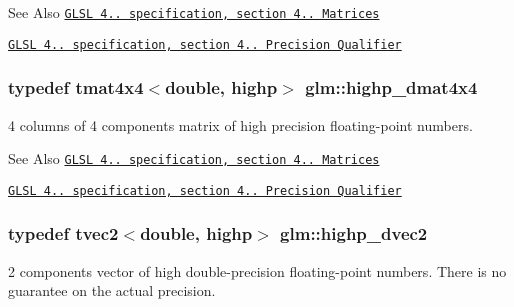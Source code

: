 \begin{DoxySeeAlso}{See Also}
\href{http://www.opengl.org/registry/doc/GLSLangSpec.4.20.8.pdf}{\tt G\-L\-S\-L 4.. specification, section 4.. Matrices} 

\href{http://www.opengl.org/registry/doc/GLSLangSpec.4.20.8.pdf}{\tt G\-L\-S\-L 4.. specification, section 4.. Precision Qualifier} 
\end{DoxySeeAlso}
\hypertarget{group__core__precision_ga46855bd8fdcb8dbc7db5d2aaeb91be69}{
\subsubsection[{highp\-\_\-dmat4x4}]{\setlength{\rightskip}{0pt plus 5cm}typedef tmat4x4$<$double, highp$>$ {\bf glm\-::highp\-\_\-dmat4x4}}}\label{group__core__precision_ga46855bd8fdcb8dbc7db5d2aaeb91be69}
4 columns of 4 components matrix of high precision floating-\/point numbers.

\begin{DoxySeeAlso}{See Also}
\href{http://www.opengl.org/registry/doc/GLSLangSpec.4.20.8.pdf}{\tt G\-L\-S\-L 4.. specification, section 4.. Matrices} 

\href{http://www.opengl.org/registry/doc/GLSLangSpec.4.20.8.pdf}{\tt G\-L\-S\-L 4.. specification, section 4.. Precision Qualifier} 
\end{DoxySeeAlso}
\hypertarget{group__core__precision_ga74ad90a083be6c50f6c285d6ab15a198}{
\subsubsection[{highp\-\_\-dvec2}]{\setlength{\rightskip}{0pt plus 5cm}typedef tvec2$<$double, highp$>$ {\bf glm\-::highp\-\_\-dvec2}}}\label{group__core__precision_ga74ad90a083be6c50f6c285d6ab15a198}
2 components vector of high double-\/precision floating-\/point numbers. There is no guarantee on the actual precision.

